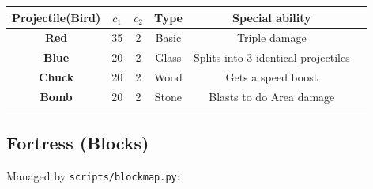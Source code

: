 \documentclass[11pt, a4paper]{article}
\begin{document}
\begin{center}
    
    \begin{tabular}{|c||c|c|c|c|c|}
    
        \hline    
        \textbf{Projectile(Bird)}   & \textbf{$c_1$} & \textbf{$c_2$} & \textbf{Type} & \textbf{Special ability}\\
        \hline
        \textbf{Red}   & 35\footnotemark & 2 & Basic & Triple damage\\
        \hline
        \textbf{Blue}  & 20 & 2 & Glass & Splits into 3 identical projectiles\\
        \hline
        \textbf{Chuck} & 20 & 2 & Wood & Gets a speed boost\\
        \hline
        \textbf{Bomb}  & 20 & 2 & Stone & Blasts to do Area damage\\
        \hline

    \end{tabular}
        
\end{center}


\vspace{1cm}

\subsection{Fortress (Blocks)}

Managed by \texttt{scripts/blockmap.py}:
\end{document}
